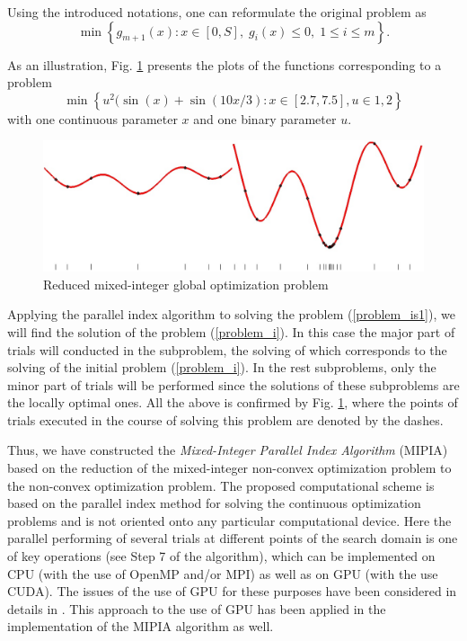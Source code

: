 \documentclass{llncs}
\begin{document}
Using the introduced notations, one can reformulate the original problem as
\begin{equation}\label{problem_is1}
\min \left\{g_{m+1}(x): x \in [0,S], \; g_i(x) \leq 0, \; 1 \leq i \leq m\right\}.
\end{equation}

As an illustration, Fig. \ref{fig:1} presents the plots of the functions corresponding to a 
problem 
\[
\min{\left\{ u^2 (\sin(x) +\sin(10x/3) : x\in [2.7, 7.5], u \in {1,2} \right\}}
\]
with one continuous parameter $x$ and one binary parameter $u$.

\begin{figure}[ht]
    \centering
    \includegraphics[width=1.0\textwidth] {fig1.jpg}
    \caption{Reduced mixed-integer global optimization problem}
    \label{fig:1}
\end{figure}

Applying the parallel index algorithm to solving the problem (\ref{problem_is1}), we will find 
the solution of the problem (\ref{problem_i}). In this case the major part of trials will conducted 
in 
the subproblem, the solving of which corresponds to the solving of the initial 
problem (\ref{problem_i}). In the rest subproblems, only the minor part of trials will be 
performed 
since the solutions of these subproblems are the locally optimal ones.
All the above is confirmed by Fig. \ref{fig:1}, where the  
points of trials executed in the course of solving this problem are denoted by the dashes.


Thus, we have constructed the \textit{Mixed-Integer Parallel Index Algorithm} \break 
(MIPIA) based on the  reduction of the mixed-integer non-convex optimization problem to the non-convex optimization problem. 
The proposed computational scheme is based on the parallel index method for solving the 
continuous optimization problems and is not oriented onto any particular computational device. 
Here the parallel performing of several trials at different points of the search domain is one of 
key operations (see Step 7 of the algorithm), which can be implemented on CPU (with the use 
of OpenMP and/or MPI) as well as on GPU (with the use CUDA). The issues of the use of 
GPU for these purposes have been considered in details in 
\cite{Barkalov2016,Gergel2016}. This approach to the use of GPU has been applied in 
the implementation of the MIPIA algorithm as well.
\end{document}
